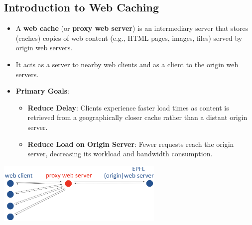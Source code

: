 \documentclass[../../compsys.tex]{subfiles}
\begin{document}
\subsection{Introduction to Web Caching}
\begin{itemize}
    \item A \textbf{web cache} (or \textbf{proxy web server}) is an intermediary server that stores (caches) copies of web content (e.g., HTML pages, images, files) served by origin web servers.
    \item It acts as a server to nearby web clients and as a client to the origin web servers.
    \item \textbf{Primary Goals}:
    \begin{itemize}
        \item \textbf{Reduce Delay}: Clients experience faster load times as content is retrieved from a geographically closer cache rather than a distant origin server.
        \item \textbf{Reduce Load on Origin Server}: Fewer requests reach the origin server, decreasing its workload and bandwidth consumption.
    \end{itemize}
\end{itemize}
\begin{center}
    \includegraphics[width=0.6\textwidth]{images/caching.png} %
\end{center}
\end{document}
